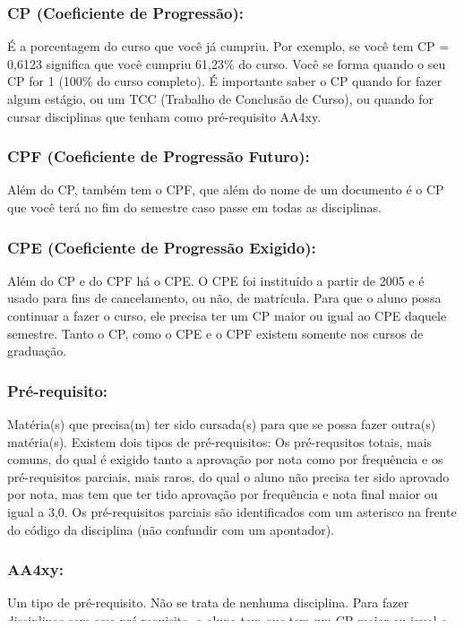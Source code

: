\subsubsection{CP (Coeficiente de Progressão):} É a porcentagem do curso que
você já cumpriu. Por exemplo, se você tem CP = 0,6123 significa que você cumpriu
61,23\% do curso. Você se forma quando o seu CP for 1 (100\% do curso
completo). É importante saber o CP quando for fazer algum estágio, ou um TCC
(Trabalho de Conclusão de Curso), ou quando for cursar disciplinas que tenham
como pré-requisito AA4xy.

\subsubsection{CPF (Coeficiente de Progressão Futuro):} Além do CP, também tem o
CPF, que além do nome de um documento é o CP que você terá no fim do semestre
caso passe em todas as disciplinas.

\subsubsection{CPE (Coeficiente de Progressão Exigido):} Além do CP e do CPF há
o CPE. O CPE foi instituído a partir de 2005 e é usado para fins de
cancelamento, ou não, de matrícula. Para que o aluno possa continuar a fazer o
curso, ele precisa ter um CP maior ou igual ao CPE daquele semestre. Tanto o CP,
como o CPE e o CPF existem somente nos cursos de graduação.

\subsubsection{Pré-requisito:} Matéria(s) que precisa(m) ter sido cursada(s)
para que se possa fazer outra(s) matéria(s). Existem dois tipos de
pré-requisitos: Os pré-requsitos totais, mais comuns, do qual é exigido tanto a
aprovação por nota como por frequência e os pré-requisitos parciais, mais raros,
do qual o aluno não precisa ter sido aprovado por nota, mas tem que ter tido
aprovação por frequência e nota final maior ou igual a 3,0. Os pré-requisitos
parciais são identificados com um asterisco na frente do código da disciplina
(não confundir com um apontador).

\subsubsection{AA4xy:} Um tipo de pré-requisito. Não se trata de nenhuma
disciplina. Para fazer disciplinas com esse pré-requisito, o aluno tem que tem
um CP maior ou igual a 0,xy.

